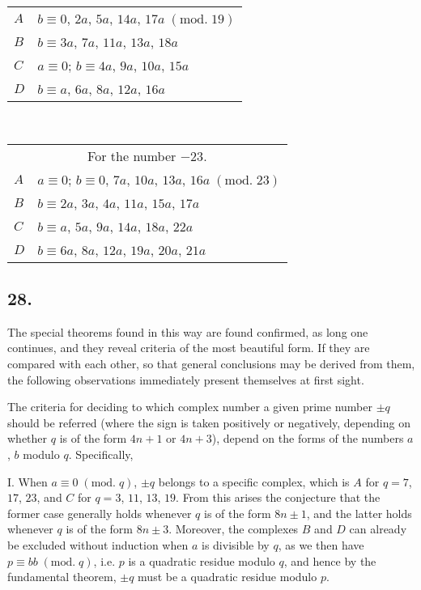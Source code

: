 \documentclass[twoside,12pt]{memoir}
\renewcommand{\pmod}[1]{\;(\textrm{mod.}\;#1)}
\begin{document}
\begin{center}
\begin{tabular}{l|l}
\(A\) & \(b \equiv 0\), \(2 a\), \(5 a\), \(14 a\), \(17 a\pmod{19} \)\\
\(B\) & \(b \equiv 3 a\), \(7 a\), \(11 a\), \(13 a\), \(18 a \)\\
\(C\) & \(a \equiv 0\); \(b \equiv 4 a\), \(9 a\), \(10 a\), \(15 a \)\\
\(D\) & \(b \equiv a\), \(6 a\), \(8 a\), \(12 a\), \(16 a\)
\end{tabular}\\
\begin{tabular}{l|l}
\multicolumn{2}{c}{For the number \(-23\).}\\
\(A\) & \(a \equiv 0\); \(b \equiv 0\), \(7 a\), \(10 a\), \(13 a\), \(16 a\pmod{23} \)\\
\(B\) & \(b \equiv 2 a\), \(3 a\), \(4 a\), \(11 a\), \(15 a\), \(17 a \)\\
\(C\) & \(b \equiv a\), \(5 a\), \(9 a\), \(14 a\), \(18 a\), \(22 a \)\\
\(D\) & \(b \equiv 6 a\), \(8 a\), \(12 a\), \(19 a\), \(20 a\), \(21 a\)
\end{tabular}
\end{center}
%

\subsection*{28.}

The special theorems found in this way are found confirmed, as long one continues, and they reveal criteria of the most beautiful form. If they are compared with each other, so that general conclusions may be derived from them, the following observations immediately present themselves at first sight.
%

The criteria for deciding to which complex number a given prime number \(\pm q\) should be referred (where the sign is taken positively or negatively, depending on whether \(q\) is of the form \(4n+1\) or \(4n+3\)), depend on the forms of the numbers \(a\), \(b\) modulo \(q\). Specifically,

I. When \(a \equiv 0\pmod{q}\), \(\pm q\) belongs to a specific complex, which is \(A\) for \(q=7\), \(17\), \(23\), and \(C\) for \(q=3\), \(11\), \(13\), \(19\). From this arises the conjecture that the former case generally holds whenever \(q\) is of the form \(8n\pm1\), and the latter holds whenever \(q\) is of the form \(8n\pm3\).  Moreover, the complexes \(B\) and \(D\) can already be excluded without induction when \(a\) is divisible by \(q\), as we then have \(p \equiv b b\pmod{q}\), i.e. \(p\) is a quadratic residue modulo \(q\), and hence by the fundamental theorem, \(\pm q\) must be a quadratic residue modulo \(p\).
\end{document}

